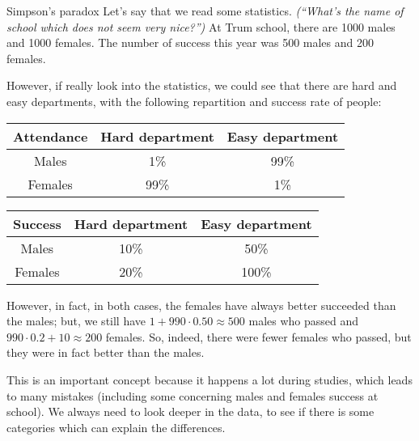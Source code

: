\documentclass[a4paper]{article}
\begin{document}
\begin{parag}{Simpson's paradox}
    Let's say that we read some statistics. \textit{(``What's the name of school which does not seem very nice?'')} At Trum school, there are 1000 males and 1000 females. The number of success this year was 500 males and 200 females.

    However, if really look into the statistics, we could see that there are hard and easy departments, with the following repartition and success rate of people:
    \begin{center}
    \begin{tabular}{c|cc}
        \textbf{Attendance} & Hard department & Easy department \\
        \hline
        Males & 1\% & 99\% \\
        Females & 99\% & 1\%
    \end{tabular}
    \end{center}
    
    \begin{center}
    \begin{tabular}{c|cc}
        \textbf{Success} & Hard department & Easy department \\
        \hline
        Males & 10\% & 50\% \\
        Females & 20\% & 100\%
    \end{tabular}
    \end{center}
    
    However, in fact, in both cases, the females have always better succeeded than the males; but, we still have $1 + 990\cdot 0.50 \approx 500$ males who passed and $990\cdot 0.2 + 10 \approx 200$ females. So, indeed, there were fewer females who passed, but they were in fact better than the males.

    This is an important concept because it happens a lot during studies, which leads to many mistakes (including some concerning males and females success at school). We always need to look deeper in the data, to see if there is some categories which can explain the differences.
\end{parag}
\end{document}
